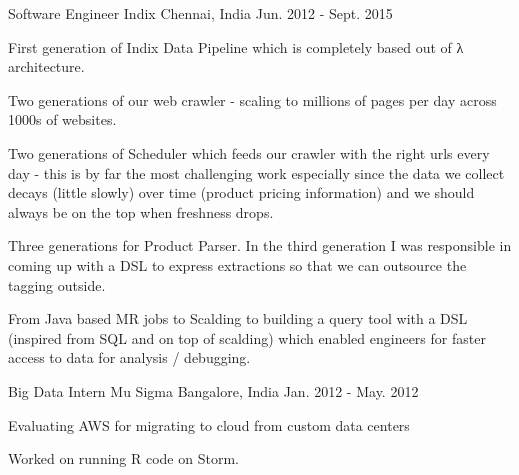 \begin{cventries}
  \cventry
    {Software Engineer} %
    {Indix} %
    {Chennai, India} %
    {Jun. 2012 - Sept. 2015} %
    {
      \begin{cvitems} %
        \item {First generation of Indix Data Pipeline which is completely based out of λ architecture. }
        \item {Two generations of our web crawler - scaling to millions of pages per day across 1000s of websites. }
        \item {Two generations of Scheduler which feeds our crawler with the right urls every day - this is by far the most challenging work especially since the data we collect decays (little slowly) over time (product pricing information) and
        we should always be on the top when freshness drops. }
        \item {Three generations for Product Parser. In the third generation I was responsible in coming up with a DSL to express extractions so that we can outsource the tagging outside.}
        \item {From Java based MR jobs to Scalding to building a query tool with a DSL (inspired from SQL and on top of scalding) which enabled engineers for faster access to data for analysis / debugging.}
      \end{cvitems}
    }

  \cventry
    {Big Data Intern} %
    {Mu Sigma} %
    {Bangalore, India} %
    {Jan. 2012 - May. 2012} %
    {
      \begin{cvitems} %
        \item {Evaluating AWS for migrating to cloud from custom data centers}
        \item {Worked on running R code on Storm.}
      \end{cvitems}
    }

\end{cventries}
